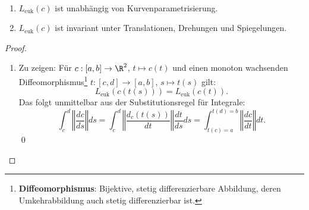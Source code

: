 \begin{lemma}\label{lm:leuklinvarianz} \
  \begin{enumerate}
    \item \( L_\text{euk}(c) \) ist unabhängig von Kurvenparametrisierung.
    \item \( L_\text{euk}(c) \) ist invariant unter Translationen, Drehungen und Spiegelungen.
  \end{enumerate}
  \begin{proof}
    \
    \begin{enumerate}
      \item Zu zeigen: Für \( c: [a,b] \to \R^2 \), \( t \mapsto c(t) \) und einen monoton wachsenden Diffeomorphismus\footnote{\textbf{Diffeomorphismus}: Bijektive, stetig differenzierbare Abbildung, deren Umkehrabbildung auch stetig differenzierbar ist.} \( t: [c, d] \to [a,b] \), \( s \mapsto t(s) \) gilt:
      \begin{equation*}
        L_\text{euk}(c(t(s))) = L_\text{euk}(c(t))\text{.}
      \end{equation*}
      Das folgt unmittelbar aus der Substitutionsregel für Integrale:
      \begin{equation*}
        \int_c^d \left\Vert \frac{dc}{ds} \right\Vert ds = \int_c^d \left\Vert \frac{d_c(t(s))}{dt} \right\Vert \frac{dt}{ds}ds = \int_{t(c) = a}^{t(d)=b} \left\Vert \frac{dc}{dt} \right\Vert dt \text{.}
      \end{equation*}\qed{}


\end{enumerate}
\end{proof}
\end{lemma}
